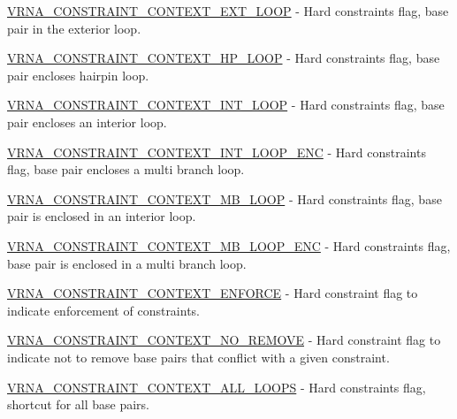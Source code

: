 \begin{DoxyItemize}
\item \hyperlink{group__hard__constraints_ga9418eda62a5dec070896702c279d2548}{V\+R\+N\+A\+\_\+\+C\+O\+N\+S\+T\+R\+A\+I\+N\+T\+\_\+\+C\+O\+N\+T\+E\+X\+T\+\_\+\+E\+X\+T\+\_\+\+L\+O\+OP} -\/ Hard constraints flag, base pair in the exterior loop.
\item \hyperlink{group__hard__constraints_ga79203702b197b6b9d3b78eed40663eb1}{V\+R\+N\+A\+\_\+\+C\+O\+N\+S\+T\+R\+A\+I\+N\+T\+\_\+\+C\+O\+N\+T\+E\+X\+T\+\_\+\+H\+P\+\_\+\+L\+O\+OP} -\/ Hard constraints flag, base pair encloses hairpin loop.
\item \hyperlink{group__hard__constraints_ga21feeab3a9e5fa5a9e3d9ac0fcf5994f}{V\+R\+N\+A\+\_\+\+C\+O\+N\+S\+T\+R\+A\+I\+N\+T\+\_\+\+C\+O\+N\+T\+E\+X\+T\+\_\+\+I\+N\+T\+\_\+\+L\+O\+OP} -\/ Hard constraints flag, base pair encloses an interior loop.
\item \hyperlink{group__hard__constraints_ga0536288e04ff6332ecdc23ca4705402b}{V\+R\+N\+A\+\_\+\+C\+O\+N\+S\+T\+R\+A\+I\+N\+T\+\_\+\+C\+O\+N\+T\+E\+X\+T\+\_\+\+I\+N\+T\+\_\+\+L\+O\+O\+P\+\_\+\+E\+NC} -\/ Hard constraints flag, base pair encloses a multi branch loop.
\item \hyperlink{group__hard__constraints_ga456ecd2ff00056bb64da8dd4f61bbfc5}{V\+R\+N\+A\+\_\+\+C\+O\+N\+S\+T\+R\+A\+I\+N\+T\+\_\+\+C\+O\+N\+T\+E\+X\+T\+\_\+\+M\+B\+\_\+\+L\+O\+OP} -\/ Hard constraints flag, base pair is enclosed in an interior loop.
\item \hyperlink{group__hard__constraints_ga02a3d703ddbcfce393e4bbfcb9db7077}{V\+R\+N\+A\+\_\+\+C\+O\+N\+S\+T\+R\+A\+I\+N\+T\+\_\+\+C\+O\+N\+T\+E\+X\+T\+\_\+\+M\+B\+\_\+\+L\+O\+O\+P\+\_\+\+E\+NC} -\/ Hard constraints flag, base pair is enclosed in a multi branch loop.
\item \hyperlink{constraints__hard_8h_a1aa55f2c6347e670e003b1a765632dad}{V\+R\+N\+A\+\_\+\+C\+O\+N\+S\+T\+R\+A\+I\+N\+T\+\_\+\+C\+O\+N\+T\+E\+X\+T\+\_\+\+E\+N\+F\+O\+R\+CE} -\/ Hard constraint flag to indicate enforcement of constraints.
\item \hyperlink{constraints__hard_8h_a9fcac36535850ff612c7e6b1305304a1}{V\+R\+N\+A\+\_\+\+C\+O\+N\+S\+T\+R\+A\+I\+N\+T\+\_\+\+C\+O\+N\+T\+E\+X\+T\+\_\+\+N\+O\+\_\+\+R\+E\+M\+O\+VE} -\/ Hard constraint flag to indicate not to remove base pairs that conflict with a given constraint.
\item \hyperlink{group__hard__constraints_ga886d9127c49bb982a4b67cd7581e8a5a}{V\+R\+N\+A\+\_\+\+C\+O\+N\+S\+T\+R\+A\+I\+N\+T\+\_\+\+C\+O\+N\+T\+E\+X\+T\+\_\+\+A\+L\+L\+\_\+\+L\+O\+O\+PS} -\/ Hard constraints flag, shortcut for all base pairs.
\end{DoxyItemize}

